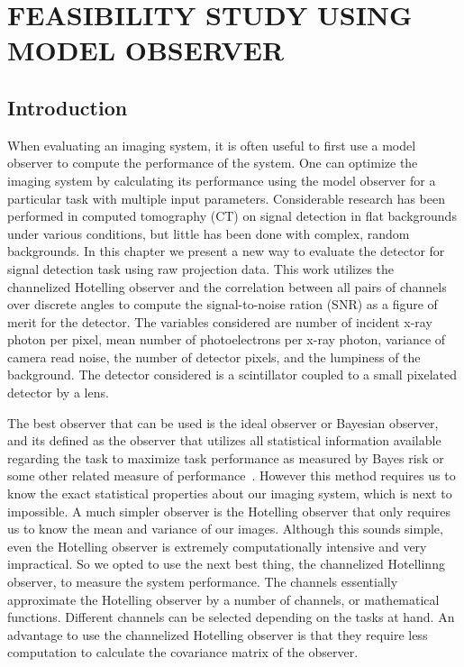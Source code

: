 \chapter{FEASIBILITY STUDY USING MODEL OBSERVER}
\label{chap:model_observer}

\section{Introduction}
When evaluating an imaging system, it is often useful to first use a model observer to compute the performance of the system.  One can optimize the imaging system by calculating its performance using the model observer for a particular task with multiple input parameters.  Considerable research has been performed in computed tomography (CT) on signal detection in flat backgrounds under various conditions, but little has been done with complex, random backgrounds.  In this chapter we present a new way to evaluate the detector for signal detection task using raw projection data.  This work utilizes the channelized Hotelling observer and the correlation between all pairs of channels over discrete angles to compute the signal-to-noise ration (SNR) as a figure of merit for the detector.  The variables considered are number of incident x-ray photon per pixel, mean number of photoelectrons per x-ray photon, variance of camera read noise, the number of detector pixels, and the lumpiness of the background.  The detector considered is a scintillator coupled to a small pixelated detector by a lens.

The best observer that can be used is the ideal observer or Bayesian observer, and its defined as the observer that utilizes all statistical information available regarding the task to maximize task performance as measured by Bayes risk or some other related measure of performance~\citep{Barrett2004}.  However this method requires us to know the exact statistical properties about our imaging system, which is next to impossible.  A much simpler observer is the Hotelling observer that only requires us to know the mean and variance of our images.  Although this sounds simple, even the Hotelling observer is extremely computationally intensive and very impractical.  So we opted to use the next best thing, the channelized Hotellinng observer,  to measure the system performance.  
The channels essentially approximate the Hotelling observer by a number of channels, or mathematical functions.  Different channels can be selected depending on the tasks at hand.  An advantage to use the channelized Hotelling observer is that they require less computation to calculate the covariance matrix of the observer.

